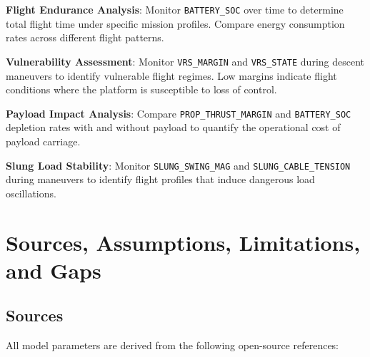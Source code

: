 \unclass \textbf{Flight Endurance Analysis}: Monitor \texttt{BATTERY\_SOC} over time to determine total flight time under specific mission profiles. Compare energy consumption rates across different flight patterns.

\unclass \textbf{Vulnerability Assessment}: Monitor \texttt{VRS\_MARGIN} and \texttt{VRS\_STATE} during descent maneuvers to identify vulnerable flight regimes. Low margins indicate flight conditions where the platform is susceptible to loss of control.

\unclass \textbf{Payload Impact Analysis}: Compare \texttt{PROP\_THRUST\_MARGIN} and \texttt{BATTERY\_SOC} depletion rates with and without payload to quantify the operational cost of payload carriage.

\unclass \textbf{Slung Load Stability}: Monitor \texttt{SLUNG\_SWING\_MAG} and \texttt{SLUNG\_CABLE\_TENSION} during maneuvers to identify flight profiles that induce dangerous load oscillations.

\pagebreak


\section{\unclass Sources, Assumptions, Limitations, and Gaps}\label{sec:SALG}

\subsection{\unclass Sources}\label{sec:Sources}

\unclass All model parameters are derived from the following open-source references:

